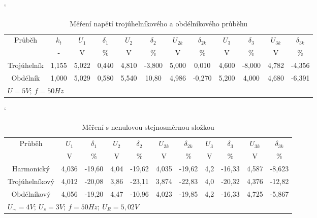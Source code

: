 \documentclass[a4paper, czech]{article}
\begin{document}
\begin{table}[H]
    \catcode`
    \centering
    \caption{Měření napětí trojúhelníkového a obdélníkového průběhu}
    \begin{tabular}{cccccccccccc}
        \toprule
        \multirow{2}{*}{Průběh} & $k_t$    & $U_1$    & $\delta_1$    & $U_2$    & $\delta_2$     & $U_{2k}$   & $\delta_{2k}$    & $U_3$    & $\delta_3$     & $U_{3k}$   & $\delta_{3k}$    \\
        \cmidrule(rl){2-2}
        \cmidrule(rl){3-4}
        \cmidrule(rl){5-8}
        \cmidrule(rl){9-12}
                                & -     & V     & \%    & V     & \%     & V     & \%     & V     & \%     & V     & \%     \\
        \midrule
        Trojúhelník             & 1,155 & 5,022 & 0,440 & 4,810 & -3,800 & 5,000 & 0,010  & 4,600 & -8,000 & 4,782 & -4,356 \\
        Obdélník                & 1,000 & 5,029 & 0,580 & 5,540 & 10,80  & 4,986 & -0,270 & 5,200 & 4,000  & 4,680 & -6,391 \\
        \bottomrule
        \multicolumn{12}{l}{$U = 5V;\ f = 50 Hz$}
    \end{tabular}
\end{table}

\begin{table}[H]
    \catcode`
    \centering
    \caption{Měření s nenulovou stejnosměrnou složkou}
    \begin{tabular}{ccccccccccc}
        \toprule
        \multirow{2}{*}{Průběh} & $U_1$    & $\delta_1$    & $U_2$    & $\delta_2$     & $U_{2k}$   & $\delta_{2k}$    & $U_3$    & $\delta_3$     & $U_{3k}$   & $\delta_{3k}$    \\
        \cmidrule(rl){2-3}
        \cmidrule(rl){4-7}
        \cmidrule(rl){8-11}
                                & V     & \%     & V    & \%     & V     & \%     & V   & \%     & V     & \%     \\
        \midrule
        Harmonický              & 4,036 & -19,60 & 4,04 & -19,62 & 4,035 & -19,62 & 4,2 & -16,33 & 4,587 & -8,623 \\
        Trojúhelníkový          & 4,012 & -20,08 & 3,86 & -23,11 & 3,874 & -22,83 & 4,0 & -20,32 & 4,376 & -12,82 \\
        Obdélníkový             & 4,056 & -19,20 & 4,47 & -10,96 & 4,023 & -19,85 & 4,2 & -16,33 & 4,725 & -5,867 \\
        \bottomrule
        \multicolumn{11}{l}{$U_{\sim} = 4V;\ U_s = 3V;\ f = 50 Hz;\ U_R = 5,02V$}
    \end{tabular}
\end{table}
\end{document}
